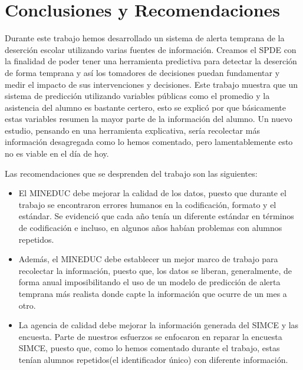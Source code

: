 \chapter{Conclusiones y Recomendaciones}
\label{ch:concureco}

Durante este trabajo hemos desarrollado un sistema de alerta temprana de la deserción escolar utilizando varias fuentes de información. Creamos el SPDE con la finalidad de poder tener una herramienta predictiva para detectar la deserción de forma temprana y así los tomadores de decisiones puedan fundamentar y medir el impacto de sus intervenciones y decisiones.
Este trabajo muestra que un sistema de predicción utilizando variables públicas como el promedio y la asistencia del alumno es bastante certero, esto se explicó por que básicamente estas variables resumen la mayor parte de la información del alumno. Un nuevo estudio, pensando en una herramienta explicativa, sería recolectar más información desagregada como lo hemos comentado, pero lamentablemente esto no es viable en el día de hoy.

Las recomendaciones que se desprenden del trabajo son las siguientes:
\begin{itemize}
\item El MINEDUC debe mejorar la calidad de los datos, puesto que durante el trabajo se encontraron errores humanos en la codificación, formato y el estándar. Se evidenció que cada año tenía un diferente estándar en términos de codificación e incluso, en algunos años habían problemas con alumnos repetidos.
\item Además, el MINEDUC debe establecer un mejor marco de trabajo para recolectar la información, puesto que, los datos se liberan, generalmente, de forma anual imposibilitando el uso de un modelo de predicción de alerta temprana más realista donde capte la información que ocurre de un mes a otro.
\item La agencia de calidad debe mejorar la información generada del SIMCE y las encuesta. Parte de nuestros esfuerzos se enfocaron en reparar la encuesta SIMCE, puesto que, como lo hemos comentado durante el trabajo, estas tenían alumnos repetidos(el identificador único) con diferente información.
\end{itemize}